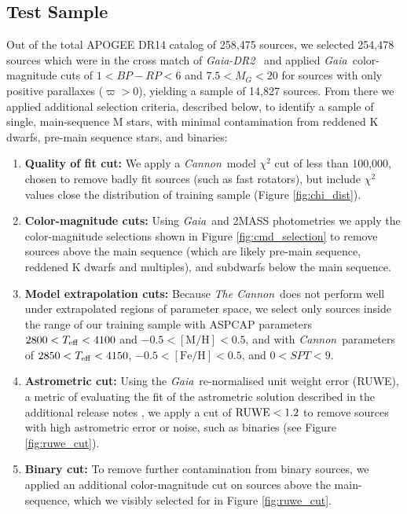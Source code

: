 \documentclass[twocolumn]{aastex62}
\newcommand{\thecannon}{\textsl{The Cannon}}
\newcommand{\cannon}{\textsl{Cannon}}
\newcommand{\gaia}{\textsl{Gaia}}
\newcommand{\drtwo}{\textsl{Gaia-DR2}}
\newcommand{\feh}{[{\mathrm{Fe}/\mathrm{H}}]}
\newcommand{\mh}{[{\mathrm{M}/\mathrm{H}}]}
\begin{document}
\subsection{Test Sample \label{subsec:test_selection}} 

Out of the total APOGEE DR14 catalog of 258,475 sources, we selected 254,478 sources which were in the cross match of \drtwo\ \citep{Brown:2018} and applied \gaia\ color-magnitude cuts of $1<BP-RP<6$ and $7.5<M_G<20$ for sources with only positive parallaxes ($\varpi>0$), yielding a sample of 14,827 sources. From there we applied additional selection criteria, described below, to identify a sample of single, main-sequence M stars, with minimal contamination from reddened K dwarfs, pre-main sequence stars, and binaries:

\begin{enumerate}
\item \textbf{Quality of fit cut:} We apply a \cannon\ model $\chi^2$ cut of less than 100,000, chosen to remove badly fit sources (such as fast rotators), but include $\chi^2$ values close the distribution of training sample (Figure \ref{fig:chi_dist}).

\item \textbf{Color-magnitude cuts:} Using \gaia\ and 2MASS photometries we apply the color-magnitude selections shown in Figure \ref{fig:cmd_selection} to remove sources above the main sequence (which are likely pre-main sequence, reddened K dwarfs and multiples), and subdwarfs below the main sequence.

\item \textbf{Model extrapolation cuts:} Because \thecannon\ does not perform well under extrapolated regions of parameter space, we select only sources inside the range of our training sample with ASPCAP parameters $2800<T_{\rm eff}<4100$ and $-0.5<\mh<0.5$, and with \cannon\ parameters of $2850<T_{\rm eff}<4150$, $-0.5<\feh<0.5$, and $0<SPT<9$.

\item \textbf{Astrometric cut:} Using the \gaia\ re-normalised unit weight error (RUWE), a metric of evaluating the fit of the astrometric solution described in the additional release notes \citep{Lindegren:2018}, we apply a cut of ${\rm RUWE}<1.2$ to remove sources with high astrometric error or noise, such as binaries (see Figure \ref{fig:ruwe_cut}).

\item \textbf{Binary cut:} To remove further contamination from binary sources, we applied an additional color-magnitude cut on sources above the main-sequence, which we visibly selected for in Figure \ref{fig:ruwe_cut}.

\end{enumerate}
\end{document}
